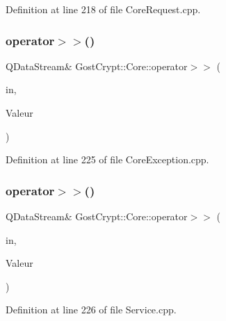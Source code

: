 Definition at line 218 of file Core\+Request.\+cpp.

\mbox{\label{namespace_gost_crypt_1_1_core_a83c08e835eda33ba886802a41c5c02ec}} 
\subsubsection{\texorpdfstring{operator$>$$>$()}{operator>>()}\hspace{0.1cm}{\footnotesize\ttfamily [41/56]}}
{\footnotesize\ttfamily Q\+Data\+Stream\& Gost\+Crypt\+::\+Core\+::operator$>$$>$ (\begin{DoxyParamCaption}\item[{Q\+Data\+Stream \&}]{in,  }\item[{\hyperlink{class_gost_crypt_1_1_core_1_1_filesystem_not_supported}{Gost\+Crypt\+::\+Core\+::\+Filesystem\+Not\+Supported} \&}]{Valeur }\end{DoxyParamCaption})}



Definition at line 225 of file Core\+Exception.\+cpp.

\mbox{\label{namespace_gost_crypt_1_1_core_a6a58cc258d21355d5da1e6e8c6639497}} 
\subsubsection{\texorpdfstring{operator$>$$>$()}{operator>>()}\hspace{0.1cm}{\footnotesize\ttfamily [42/56]}}
{\footnotesize\ttfamily Q\+Data\+Stream\& Gost\+Crypt\+::\+Core\+::operator$>$$>$ (\begin{DoxyParamCaption}\item[{Q\+Data\+Stream \&}]{in,  }\item[{\hyperlink{class_gost_crypt_1_1_core_1_1_unknow_response}{Gost\+Crypt\+::\+Core\+::\+Unknow\+Response} \&}]{Valeur }\end{DoxyParamCaption})}



Definition at line 226 of file Service.\+cpp.

